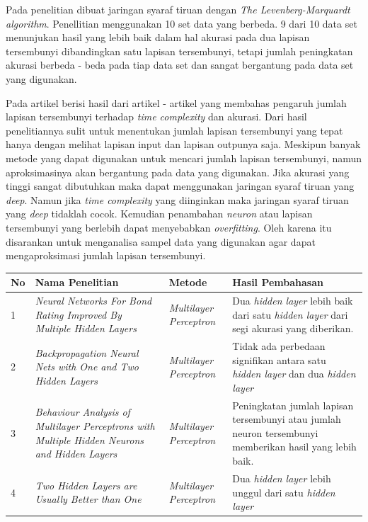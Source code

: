 Pada penelitian\cite{Thomas2017} dibuat jaringan syaraf tiruan dengan \textit{The Levenberg-Marquardt algorithm}. Penellitian menggunakan 10 set data yang berbeda. 9 dari 10 data set menunjukan hasil yang lebih baik dalam hal akurasi pada dua lapisan tersembunyi dibandingkan satu lapisan tersembunyi, tetapi jumlah peningkatan akurasi berbeda - beda pada tiap data set dan sangat bergantung pada data set yang digunakan.

Pada artikel\cite{Uzair} berisi hasil dari artikel - artikel yang membahas pengaruh jumlah lapisan tersembunyi terhadap \textit{time complexity} dan akurasi. Dari hasil penelitiannya sulit untuk menentukan jumlah lapisan tersembunyi yang tepat hanya dengan melihat lapisan input dan lapisan outpunya saja. Meskipun banyak metode yang dapat digunakan untuk mencari jumlah lapisan tersembunyi, namun aproksimasinya akan bergantung pada data yang digunakan. Jika akurasi yang tinggi sangat dibutuhkan maka dapat menggunakan jaringan syaraf tiruan yang \textit{deep}. Namun jika \textit{time complexity} yang diinginkan maka jaringan syaraf tiruan yang \textit{deep} tidaklah cocok. Kemudian penambahan \textit{neuron} atau lapisan tersembunyi yang berlebih dapat menyebabkan \textit{overfitting}. Oleh karena itu disarankan untuk menganalisa sampel data yang digunakan agar dapat mengaproksimasi jumlah lapisan tersembunyi.
\begin{table}[H]
    \centering
    \begin{tabular}{| p{0.5cm} | p{10em} | p{5em} | p{10em} |} 
    \hline
    \textbf{No} & \textbf{Nama Penelitian} & \textbf{Metode} & \textbf{Hasil Pembahasan} \\ [0.5ex] 
    \hline
    1 & \textit{Neural Networks For Bond Rating Improved By Multiple Hidden Layers} & \textit{Multilayer Perceptron} & Dua \textit{hidden layer} lebih baik dari satu \textit{hidden layer} dari segi akurasi yang diberikan. \\ 
    \hline
    2 & \textit{Backpropagation Neural Nets with One and Two Hidden Layers} & \textit{Multilayer Perceptron} & Tidak ada perbedaan signifikan antara satu \textit{hidden layer} dan dua \textit{hidden layer}\\
    \hline
    3 & \textit{Behaviour Analysis of \textit{Multilayer Perceptron}s with Multiple Hidden Neurons and Hidden Layers} & \textit{Multilayer Perceptron} & Peningkatan jumlah lapisan tersembunyi atau jumlah neuron tersembunyi memberikan hasil yang lebih baik.\\
    \hline
    4 & \textit{Two Hidden Layers are Usually Better than One} & \textit{Multilayer Perceptron} & Dua \textit{hidden layer} lebih unggul dari satu \textit{hidden layer} \\ 
    \hline
    \end{tabular}
\end{table}

